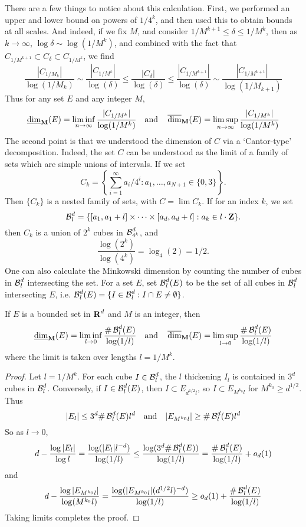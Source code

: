 There are a few things to notice about this calculation. First, we performed an upper and lower bound on powers of $1/4^k$, and then used this to obtain bounds at all scales. And indeed, if we fix $M$, and consider $1/M^{k+1} \leq \delta \leq 1/M^k$, then as $k \to \infty$, $\log \delta \sim \log(1/M^k)$, and combined with the fact that $C_{1/M^{k+1}} \subset C_\delta \subset C_{1/M^k}$, we find
%
\[ \frac{|C_{1/M_k}|}{\log(1/M_k)} \sim \frac{|C_{1/M^k}|}{\log(\delta)} \leq \frac{|C_\delta|}{\log(\delta)} \leq \frac{|C_{1/M^{k+1}}|}{\log(\delta)} \sim \frac{|C_{1/M^{k+1}}|}{\log(1/M_{k+1})} \]
%
Thus for any set $E$ and any integer $M$,
%
\[ \operatorname{\underline{\dim}_{\mathbf{M}}}(E) = \liminf_{n \to \infty} \frac{|C_{1/M^k}|}{\log(1/M^k)}\quad\text{and}\quad \operatorname{\overline{\dim}_{\mathbf{M}}}(E) = \limsup_{n \to \infty} \frac{|C_{1/M^k}|}{\log(1/M^k)} \]
%
The second point is that we understood the dimension of $C$ via a `Cantor-type' decomposition. Indeed, the set $C$ can be understood as the limit of a family of sets which are simple unions of intervals. If we set
%
\[ C_k = \left\{ \sum_{i = 1}^\infty a_i/4^i : a_1, \dots, a_{N+1} \in \{ 0, 3 \} \right\}. \]
%
Then $\{ C_k \}$ is a nested family of sets, with $C = \lim C_k$. If for an index $k$, we set
%
\[ \operatorname{\mathcal{B}}^d_l = \{ [a_1, a_1 + l] \times \cdots \times [a_d, a_d + l] : a_k \in l \cdot \operatorname{\mathbf{Z}} \}. \]
%
then $C_k$ is a union of $2^k$ cubes in $\operatorname{\mathcal{B}}^d_{4^k}$, and
%
\[ \frac{\log(2^k)}{\log(4^k)} = \log_4(2) = 1/2. \]
%
One can also calculate the Minkowski dimension by counting the number of cubes in $\operatorname{\mathcal{B}}^d_l$ intersecting the set. For a set $E$, set $\operatorname{\mathcal{B}}^d_l(E)$ to be the set of all cubes in $\operatorname{\mathcal{B}}^d_l$ intersecting $E$, i.e. $\operatorname{\mathcal{B}}^d_l(E) = \{ I \in \operatorname{\mathcal{B}}^d_l: I \cap E \neq \emptyset \}$.

\begin{lemma}
	If $E$ is a bounded set in $\operatorname{\mathbf{R}}^d$ and $M$ is an integer, then
	\[ \operatorname{\underline{\dim}_{\mathbf{M}}}(E) = \liminf_{l \to 0} \frac{\# \operatorname{\mathcal{B}}^d_l(E)}{\log(1/l)}\quad\text{and}\quad \operatorname{\overline{\dim}_{\mathbf{M}}}(E) = \limsup_{l \to 0} \frac{\# \operatorname{\mathcal{B}}^d_l(E)}{\log(1/l)} \]
	where the limit is taken over lengths $l = 1/M^k$.
\end{lemma}
\begin{proof}
	Let $l = 1/M^k$. For each cube $I \in \operatorname{\mathcal{B}}^d_l$, the $l$ thickening $I_l$ is contained in $3^d$ cubes in $\operatorname{\mathcal{B}}^d_l$. Conversely, if $I \in \operatorname{\mathcal{B}}^d_l(E)$, then $I \subset E_{d^{1/2} l}$, so $I \subset E_{M^{k_0} l}$ for $M^{k_0} \geq d^{1/2}$. Thus
	\[ |E_l| \leq 3^d \# \operatorname{\mathcal{B}}^d_l(E) l^d\quad\text{and}\quad|E_{M^{k_0} l}| \geq \# \operatorname{\mathcal{B}}^d_l(E) l^d \]
	So as $l \to 0$,
	\[ d - \frac{\log |E_l|}{\log l} = \frac{\log(|E_l| l^{-d})}{\log(1/l)} \leq \frac{\log(3^d \# \operatorname{\mathcal{B}}^d_l(E))}{\log(1/l)} = \frac{\# \operatorname{\mathcal{B}}^d_l(E)}{\log(1/l)} + o_d(1) \]
	and
	\[ d - \frac{\log|E_{M^{k_0} l} |}{\log(M^{k_0} l)} = \frac{\log(|E_{M^{k_0} l}| (d^{1/2} l)^{-d})}{\log(1/l)} \geq o_d(1) + \frac{\# \operatorname{\mathcal{B}}^d_l(E)}{\log(1/l)} \]
	Taking limits completes the proof.
\end{proof}

